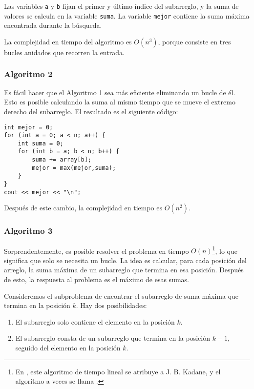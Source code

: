 Las variables \texttt{a} y \texttt{b} fijan el primer y
último índice del subarreglo,
y la suma de valores se calcula en la variable \texttt{suma}.
La variable \texttt{mejor} contiene la suma máxima encontrada durante la búsqueda.

La complejidad en tiempo del algoritmo es $O(n^3)$,
porque consiste en tres bucles anidados
que recorren la entrada.

\subsubsection{Algoritmo 2}

Es fácil hacer que el Algoritmo 1 sea más eficiente
eliminando un bucle de él.
Esto es posible calculando la suma al mismo
tiempo que se mueve el extremo derecho del subarreglo.
El resultado es el siguiente código:

\begin{lstlisting}
int mejor = 0;
for (int a = 0; a < n; a++) {
    int suma = 0;
    for (int b = a; b < n; b++) {
        suma += array[b];
        mejor = max(mejor,suma);
    }
}
cout << mejor << "\n";
\end{lstlisting}
Después de este cambio, la complejidad en tiempo es $O(n^2)$.

\subsubsection{Algoritmo 3}

Sorprendentemente, es posible resolver el problema
en tiempo $O(n)$\footnote{En \cite{ben86}, este algoritmo de tiempo lineal
se atribuye a J. B. Kadane, y el algoritmo a veces se
llama  .}, lo que significa
que solo se necesita un bucle.
La idea es calcular, para cada posición del arreglo,
la suma máxima de un subarreglo que termina en esa posición.
Después de esto, la respuesta al problema es el
máximo de esas sumas.

Consideremos el subproblema de encontrar el subarreglo de suma máxima
que termina en la posición $k$.
Hay dos posibilidades:
\begin{enumerate}
\item El subarreglo solo contiene el elemento en la posición $k$.
\item El subarreglo consta de un subarreglo que termina
en la posición $k-1$, seguido del elemento en la posición $k$.
\end{enumerate}

